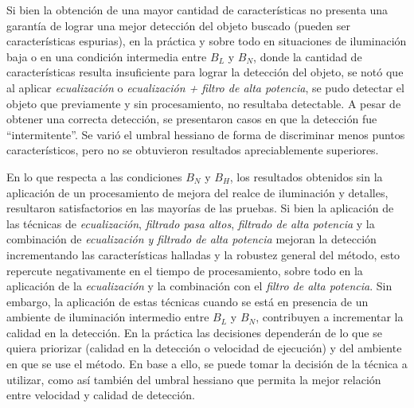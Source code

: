 Si bien la obtención de una mayor cantidad de características no presenta una garantía de lograr una mejor detección del objeto buscado (pueden ser características espurias), en la práctica y sobre todo en situaciones de iluminación baja o en una condición intermedia entre $B_{L}$ y $B_{N}$, donde la cantidad de características resulta insuficiente para lograr la detección del objeto, se notó que al aplicar \textit{ecualización} o \textit{ecualización + filtro de alta potencia}, se pudo detectar el objeto que previamente y sin procesamiento, no resultaba detectable. A pesar de obtener una correcta detección, se presentaron casos en que la detección fue ``intermitente''. Se varió el umbral hessiano de forma de discriminar menos puntos característicos, pero no se obtuvieron resultados apreciablemente superiores.

En lo que respecta a las condiciones $B_{N}$ y $B_{H}$, los resultados obtenidos sin la aplicación de un procesamiento de mejora del realce de iluminación y detalles, resultaron satisfactorios en las mayorías de las pruebas. Si bien la aplicación de las técnicas de \textit{ecualización}, \textit{filtrado pasa altos}, \textit{filtrado de alta potencia} y la combinación de \textit{ecualización y filtrado de alta potencia} mejoran la detección incrementando las características halladas y la robustez general del método, esto repercute negativamente en el tiempo de procesamiento, sobre todo en la aplicación de la \textit{ecualización} y la combinación con el \textit{filtro de alta potencia}. Sin embargo, la aplicación de estas técnicas cuando se está en presencia de un ambiente de iluminación intermedio entre $B_{L}$ y $B_{N}$, contribuyen a incrementar la calidad en la detección. En la práctica las decisiones dependerán de lo que se quiera priorizar (calidad en la detección o velocidad de ejecución) y del ambiente en que se use el método. En base a ello, se puede tomar la decisión de la técnica a utilizar, como así también del umbral hessiano que permita la mejor relación entre velocidad y calidad de detección.
